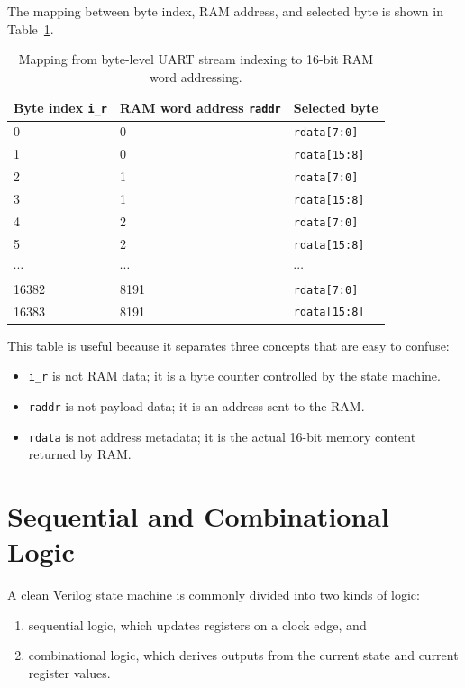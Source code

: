 \documentclass[11pt,a4paper]{article}
\begin{document}
The mapping between byte index, RAM address, and selected byte is shown in Table~\ref{tab:mapping}.

\begin{table}[h]
\centering
\renewcommand{\arraystretch}{1.25}
\begin{tabular}{@{}lll@{}}
\toprule
Byte index \texttt{i\_r} & RAM word address \texttt{raddr} & Selected byte \\
\midrule
0 & 0 & \texttt{rdata[7:0]} \\
1 & 0 & \texttt{rdata[15:8]} \\
2 & 1 & \texttt{rdata[7:0]} \\
3 & 1 & \texttt{rdata[15:8]} \\
4 & 2 & \texttt{rdata[7:0]} \\
5 & 2 & \texttt{rdata[15:8]} \\
\(\cdots\) & \(\cdots\) & \(\cdots\) \\
16382 & 8191 & \texttt{rdata[7:0]} \\
16383 & 8191 & \texttt{rdata[15:8]} \\
\bottomrule
\end{tabular}
\caption{Mapping from byte-level UART stream indexing to 16-bit RAM word addressing.}
\label{tab:mapping}
\end{table}

This table is useful because it separates three concepts that are easy to confuse:

\begin{itemize}
  \item \texttt{i\_r} is not RAM data; it is a byte counter controlled by the state machine.
  \item \texttt{raddr} is not payload data; it is an address sent to the RAM.
  \item \texttt{rdata} is not address metadata; it is the actual 16-bit memory content returned by RAM.
\end{itemize}

\section{Sequential and Combinational Logic}

A clean Verilog state machine is commonly divided into two kinds of logic:

\begin{enumerate}
  \item sequential logic, which updates registers on a clock edge, and
  \item combinational logic, which derives outputs from the current state and current register values.
\end{enumerate}
\end{document}
